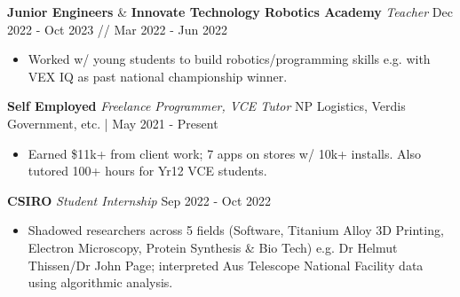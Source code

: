 \documentclass[a4paper]{article}
\begin{document}
\textbf{Junior Engineers} \& \textbf{Innovate Technology Robotics Academy} \textit{Teacher} \hfill Dec 2022 - Oct 2023 // Mar 2022 - Jun 2022\\
\vspace{-3.5mm}
\begin{itemize} \itemsep 0.5pt
    \item Worked w/ young students to build robotics/programming skills e.g. with VEX IQ as past national championship winner.
\end{itemize}
\vspace{-2.5mm}

\textbf{Self Employed} \textit{Freelance Programmer, VCE Tutor} \hfill NP Logistics, Verdis Government, etc. | May 2021 - Present\\
\vspace{-3.5mm}
\begin{itemize} \itemsep 0.5pt
\item Earned \$11k+ from client work; 7 apps on stores w/ 10k+ installs.
Also tutored 100+ hours for Yr12 VCE students.
\end{itemize}
\vspace{-2.5mm}

\textbf{CSIRO} \textit{Student Internship} \hfill Sep 2022 - Oct 2022\\
\vspace{-3.5mm}
\begin{itemize} \itemsep 0.5pt
\item Shadowed researchers across 5 fields (Software, Titanium Alloy 3D Printing, Electron Microscopy, Protein Synthesis \& Bio Tech) e.g. Dr Helmut Thissen/Dr John Page; interpreted Aus Telescope National Facility data using algorithmic analysis.
\end{itemize}
\vspace{-2.5mm}
\end{document}
